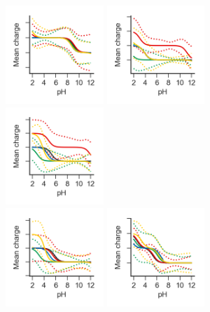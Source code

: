 \documentclass[9pt,lineno,final]{elife}
\begin{document}
	
\begin{figure}[H]	
	\centering
	\includegraphics[width=0.33\textwidth]{Reports/overview-virtual-titration-SM10.png}
	\includegraphics[width=0.33\textwidth]{Reports/overview-virtual-titration-SM11.png}
	\includegraphics[width=0.33\textwidth]{Reports/overview-virtual-titration-SM12.png}	 \\
	\includegraphics[width=0.33\textwidth]{Reports/overview-virtual-titration-SM13.png}
	\includegraphics[width=0.33\textwidth]{Reports/overview-virtual-titration-SM14.png}

\end{figure}
\end{document}
